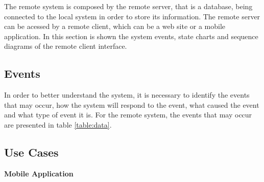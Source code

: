 The remote system is composed by the remote server, that is a database, being connected to the local system in order to store its information. The remote server can be acessed by a remote client, which can be a web site or a mobile application. In this section is shown the system events, state charts and sequence diagrams of the remote client interface.

\subsection{Events}
In order to better understand the system, it is necessary to identify the events that may occur, how the system will respond to the event, what caused the event and what type of event it is. For the remote system, the events that may occur are presented in table \ref{table:data}.

\begin{table}[ht]
	\centering
		
	\caption{Remote system events.}
	\label{table:data}
\end{table}


\subsection{Use Cases}
\textbf{Mobile Application}

